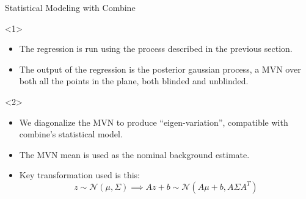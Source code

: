 \documentclass[10pt]{beamer}
\begin{document}

\begin{frame}[fragile, label=current]{Statistical Modeling with Combine}
  \begin{center}
  \end{center} 
  \begin{overlayarea}{\textwidth}{0.8\textwidth}
    \begin{center}
      \begin{onlyenv}<1>
        \begin{itemize}
        \item The regression is run using the process described in the previous section.
        \item The output of the regression is the posterior gaussian process, a MVN over both all the points in the plane, both blinded and unblinded.
        \end{itemize}
      \end{onlyenv}
      \begin{onlyenv}<2>
        \begin{itemize}
        \item We diagonalize the MVN to produce ``eigen-variation'', compatible with combine's statistical model.
        \item The MVN mean is used as the nominal background estimate.
        \item Key transformation used is this:
          \begin{equation}
            z \sim \mathcal{N} \left( \mu,\Sigma \right) \implies  A z + b \sim \mathcal{N} \left( A \mu + b , A \Sigma A^{T} \right)
          \end{equation}


\end{itemize}
\end{onlyenv}
\end{center}
\end{overlayarea}
\end{frame}
\end{document}
